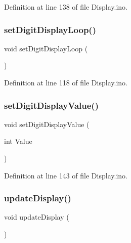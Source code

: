 Definition at line 138 of file Display.\+ino.

\mbox{\label{_display_8ino_a3ae520b9d52111849eda60c42617230f}} 
\subsubsection{\texorpdfstring{setDigitDisplayLoop()}{setDigitDisplayLoop()}}
{\footnotesize\ttfamily void set\+Digit\+Display\+Loop (\begin{DoxyParamCaption}{ }\end{DoxyParamCaption})}



Definition at line 118 of file Display.\+ino.

\mbox{\label{_display_8ino_a8645226b3b065f505ca518b8ebdded8e}} 
\subsubsection{\texorpdfstring{setDigitDisplayValue()}{setDigitDisplayValue()}}
{\footnotesize\ttfamily void set\+Digit\+Display\+Value (\begin{DoxyParamCaption}\item[{int}]{Value }\end{DoxyParamCaption})}



Definition at line 143 of file Display.\+ino.

\mbox{\label{_display_8ino_ab7eb3c8c2e8604801ee00f11d3af8c3f}} 
\subsubsection{\texorpdfstring{updateDisplay()}{updateDisplay()}}
{\footnotesize\ttfamily void update\+Display (\begin{DoxyParamCaption}{ }\end{DoxyParamCaption})}




